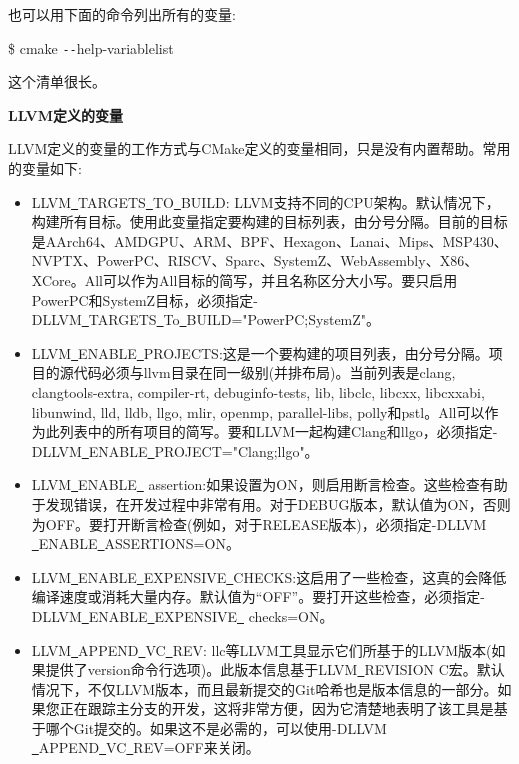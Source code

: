 也可以用下面的命令列出所有的变量:\par

\begin{tcolorbox}[colback=white,colframe=black]
	\$ cmake \verb|--|help-variablelist
\end{tcolorbox}

这个清单很长。\par


\hspace*{\fill} \par %
\textbf{LLVM定义的变量}

LLVM定义的变量的工作方式与CMake定义的变量相同，只是没有内置帮助。常用的变量如下:\par

\begin{itemize}
	\item LLVM\underline{~}TARGETS\underline{~}TO\underline{~}BUILD: LLVM支持不同的CPU架构。默认情况下，构建所有目标。使用此变量指定要构建的目标列表，由分号分隔。目前的目标是AArch64、AMDGPU、ARM、BPF、Hexagon、Lanai、Mips、MSP430、NVPTX、PowerPC、RISCV、Sparc、SystemZ、WebAssembly、X86、XCore。All可以作为All目标的简写，并且名称区分大小写。要只启用PowerPC和SystemZ目标，必须指定-DLLVM\underline{~}TARGETS\underline{~}To\underline{~}BUILD="PowerPC;SystemZ"。
	
	\item LLVM\underline{~}ENABLE\underline{~}PROJECTS:这是一个要构建的项目列表，由分号分隔。项目的源代码必须与llvm目录在同一级别(并排布局)。当前列表是clang, clangtools-extra, compiler-rt, debuginfo-tests, lib, libclc, libcxx, libcxxabi, libunwind, lld, lldb, llgo, mlir, openmp, parallel-libs, polly和pstl。All可以作为此列表中的所有项目的简写。要和LLVM一起构建Clang和llgo，必须指定-DLLVM\underline{~}ENABLE\underline{~}PROJECT="Clang;llgo"。
	
	\item LLVM\underline{~}ENABLE\underline{~} assertion:如果设置为ON，则启用断言检查。这些检查有助于发现错误，在开发过程中非常有用。对于DEBUG版本，默认值为ON，否则为OFF。要打开断言检查(例如，对于RELEASE版本)，必须指定-DLLVM \underline{~}ENABLE\underline{~}ASSERTIONS=ON。
	
	\item LLVM\underline{~}ENABLE\underline{~}EXPENSIVE\underline{~}CHECKS:这启用了一些检查，这真的会降低编译速度或消耗大量内存。默认值为“OFF”。要打开这些检查，必须指定-DLLVM\underline{~}ENABLE\underline{~}EXPENSIVE\underline{~} checks=ON。
	
	\item LLVM\underline{~}APPEND\underline{~}VC\underline{~}REV: llc等LLVM工具显示它们所基于的LLVM版本(如果提供了version命令行选项)。此版本信息基于LLVM\underline{~}REVISION C宏。默认情况下，不仅LLVM版本，而且最新提交的Git哈希也是版本信息的一部分。如果您正在跟踪主分支的开发，这将非常方便，因为它清楚地表明了该工具是基于哪个Git提交的。如果这不是必需的，可以使用-DLLVM \underline{~}APPEND\underline{~}VC\underline{~}REV=OFF来关闭。
	

\end{itemize}
